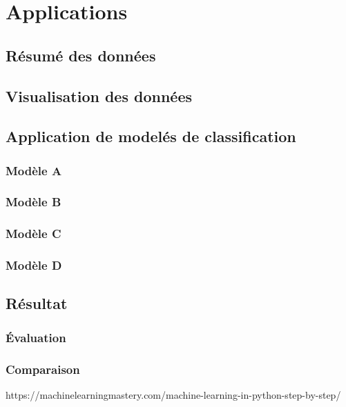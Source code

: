\section{Applications}
\subsection{Résumé des données}
\subsection{Visualisation des données}
\subsection{Application de modelés de classification}
\subsubsection{Modèle A}
\subsubsection{Modèle B}
\subsubsection{Modèle C}
\subsubsection{Modèle D}
\subsection{Résultat}
\subsubsection{Évaluation}
\subsubsection{Comparaison}
https://machinelearningmastery.com/machine-learning-in-python-step-by-step/